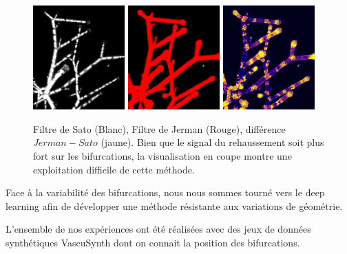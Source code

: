 \begin{figure}[ht]
    \centering
    \includegraphics[height=4cm]{Images/SatoFilter_bif.png}
    \includegraphics[height=4cm]{Images/JermanFilter_bif.png}
    \includegraphics[height=4cm]{Images/subJermanSato_bif.png}
    \caption{Filtre de Sato (Blanc), Filtre de Jerman (Rouge), différence $Jerman - Sato$ (jaune). Bien que le signal du rehaussement soit plus fort sur les bifurcations, la visualisation en coupe montre une exploitation difficile de cette méthode.}
    \label{fig:subtract_vesselness}
\end{figure}

Face à la variabilité des bifurcations, nous nous sommes tourné vers le deep learning afin de développer une méthode résistante aux variations de géométrie.

L'ensemble de nos expériences ont été réalisées avec des jeux de données synthétiques VascuSynth dont on connait la position des bifurcations.

